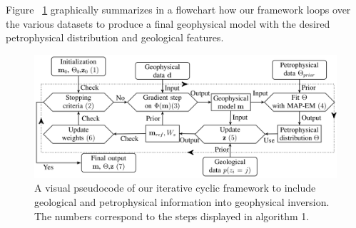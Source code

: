 Figure ~\ref{Flowchart} graphically summarizes in a flowchart how our framework loops over the various datasets to produce a final geophysical model with the desired petrophysical distribution and geological features.

\begin{figure}
    \includegraphics[width=\columnwidth]{./Fig/LowRes/Flowchart.png}
    \caption{A visual pseudocode of our iterative cyclic framework to include geological and petrophysical information into geophysical inversion. The numbers correspond to the steps displayed in algorithm 1.}
    \label{Flowchart}
\end{figure}
